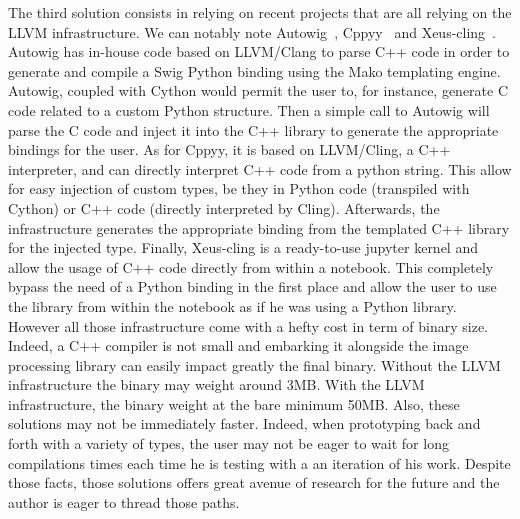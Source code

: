 The third solution consists in relying on recent projects that are all relying on the LLVM infrastructure. We can
notably note Autowig~\parencite{fernique.2018.autowig}, Cppyy~\parencite{wimtlplavrijsen.2016.cppyy} and
Xeus-cling~\parencite{quantstack.2021.xeus-cling}. Autowig has in-house code based on LLVM/Clang to parse C++ code in
order to generate and compile a Swig Python binding using the Mako templating engine. Autowig, coupled with Cython would
permit the user to, for instance, generate C code related to a custom Python structure. Then a simple call to Autowig
will parse the C code and inject it into the C++ library to generate the appropriate bindings for the user. As for
Cppyy, it is based on LLVM/Cling, a C++ interpreter, and can directly interpret C++ code from a python string. This
allow for easy injection of custom types, be they in Python code (transpiled with Cython) or C++ code (directly
interpreted by Cling). Afterwards, the infrastructure generates the appropriate binding from the templated C++ library
for the injected type. Finally, Xeus-cling is a ready-to-use jupyter kernel and allow the usage of C++ code directly
from within a notebook. This completely bypass the need of a Python binding in the first place and allow the user to use
the library from within the notebook as if he was using a Python library. However all those infrastructure come with a
hefty cost in term of binary size. Indeed, a C++ compiler is not small and embarking it alongside the image processing
library can easily impact greatly the final binary. Without the LLVM infrastructure the binary may weight around 3MB.
With the LLVM infrastructure, the binary weight at the bare minimum 50MB. Also, these solutions may not be immediately
faster. Indeed, when prototyping back and forth with a variety of types, the user may not be eager to wait for long
compilations times each time he is testing with a an iteration of his work. Despite those facts, those solutions offers
great avenue of research for the future and the author is eager to thread those paths.
